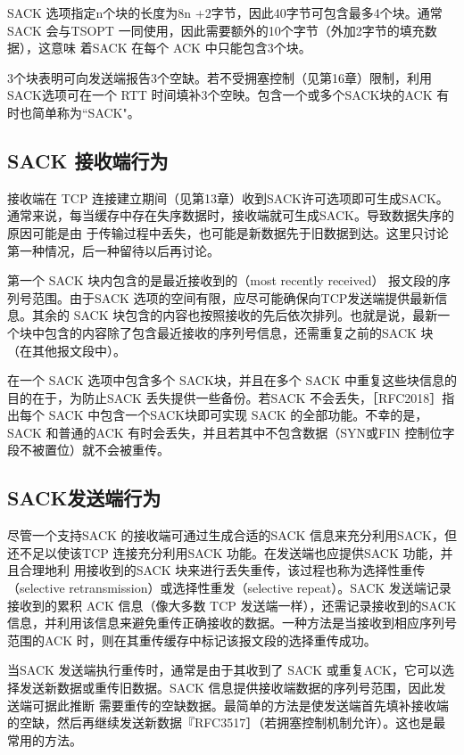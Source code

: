 SACK 选项指定n个块的长度为8n +2字节，因此40字节可包含最多4个块。通常SACK 会与TSOPT 一同使用，因此需要额外的10个字节（外加2字节的填充数据），这意味
着SACK 在每个 ACK 中只能包含3个块。

3个块表明可向发送端报告3个空缺。若不受拥塞控制（见第16章）限制，利用SACK选项可在一个 RTT 时间填补3个空映。包含一个或多个SACK块的ACK 有时也简单称为“SACK"。

\subsection{SACK 接收端行为}
接收端在 TCP 连接建立期间（见第13章）收到SACK许可选项即可生成SACK。通常来说，每当缓存中存在失序数据时，接收端就可生成SACK。导致数据失序的原因可能是由
于传输过程中丢失，也可能是新数据先于旧数据到达。这里只讨论第一种情况，后一种留待以后再讨论。

第一个 SACK 块内包含的是最近接收到的（most recently received） 报文段的序列号范围。由于SACK 选项的空间有限，应尽可能确保向TCP发送端提供最新信息。其余的
SACK 块包含的内容也按照接收的先后依次排列。也就是说，最新一个块中包含的内容除了包含最近接收的序列号信息，还需重复之前的SACK 块（在其他报文段中）。

在一个 SACK 选项中包含多个 SACK块，并且在多个 SACK 中重复这些块信息的目的在于，为防止SACK 丢失提供一些备份。若SACK 不会丢失，［RFC2018］指出每个 SACK
中包含一个SACK块即可实现 SACK 的全部功能。不幸的是，SACK 和普通的ACK 有时会丢失，并且若其中不包含数据（SYN或FIN 控制位字段不被置位）就不会被重传。

\subsection{SACK发送端行为}
尽管一个支持SACK 的接收端可通过生成合适的SACK 信息来充分利用SACK，但还不足以使该TCP 连接充分利用SACK 功能。在发送端也应提供SACK 功能，并且合理地利
用接收到的SACK 块来进行丢失重传，该过程也称为选择性重传（selective retransmission）或选择性重发（selective repeat）。SACK 发送端记录接收到的累积 ACK 信息（像大多数 TCP
发送端一样），还需记录接收到的SACK 信息，并利用该信息来避免重传正确接收的数据。一种方法是当接收到相应序列号范围的ACK 时，则在其重传缓存中标记该报文段的选择重传成功。

当SACK 发送端执行重传时，通常是由于其收到了 SACK 或重复ACK，它可以选择发送新数据或重传旧数据。SACK 信息提供接收端数据的序列号范围，因此发送端可据此推断
需要重传的空缺数据。最简单的方法是使发送端首先填补接收端的空缺，然后再继续发送新数据『RFC3517］（若拥塞控制机制允许）。这也是最常用的方法。

